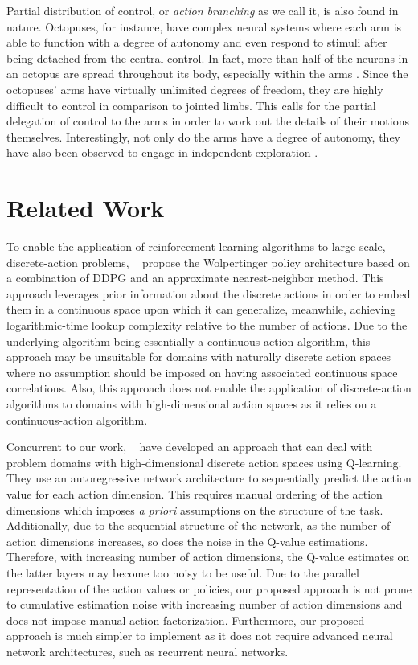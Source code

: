 \documentclass[letterpaper]{article} %
\newcommand{\citet}[1]
{\citeauthor{#1}~\shortcite{#1}}
\newcommand{\citep}{\cite}
\begin{document}
Partial distribution of control, or \textit{action branching} as we call it, is also found in nature. Octopuses, for instance, have complex neural systems where each arm is able to function with a degree of autonomy and even respond to stimuli after being detached from the central control. In fact, more than half of the neurons in an octopus are spread throughout its body, especially within the arms \citep{Godfrey:2016octopus}. Since the octopuses' arms have virtually unlimited degrees of freedom, they are highly difficult to control in comparison to jointed limbs.
This calls for the partial delegation of control to the arms in order to work out the details of their motions themselves. Interestingly, not only do the arms have a degree of autonomy, they have also been observed to engage in independent exploration \citep{Godfrey:2016octopus}.


\section{Related Work}
\label{sec:relatedwork}

To enable the application of reinforcement learning algorithms to large-scale, discrete-action problems, \citet{Dulac:2015} propose the Wolpertinger policy architecture based on a combination of DDPG and an approximate nearest-neighbor method. This approach leverages prior information about the discrete actions in order to embed them in a continuous space upon which it can generalize, meanwhile, achieving logarithmic-time lookup complexity relative to the number of actions. Due to the underlying algorithm being essentially a continuous-action algorithm, this approach may be unsuitable for domains with naturally discrete action spaces where no assumption should be imposed on having associated continuous space correlations. Also, this approach does not enable the application of discrete-action algorithms to domains with high-dimensional action spaces as it relies on a continuous-action algorithm.

Concurrent to our work, \citet{Metz:2017} have developed an approach that can deal with problem domains with high-dimensional discrete action spaces using Q-learning. They use an autoregressive network architecture to sequentially predict the action value for each action dimension. This requires manual ordering of the action dimensions which imposes \textit{a priori} assumptions on the structure of the task. Additionally, due to the sequential structure of the network, as the number of action dimensions increases, so does the noise in the Q-value estimations. Therefore, with increasing number of action dimensions, the Q-value estimates on the latter layers may become too noisy to be useful. Due to the parallel representation of the action values or policies, our proposed approach is not prone to cumulative estimation noise with increasing number of action dimensions and does not impose manual action factorization. Furthermore, our proposed approach is much simpler to implement as it does not require advanced neural network architectures, such as recurrent neural networks.
\end{document}
